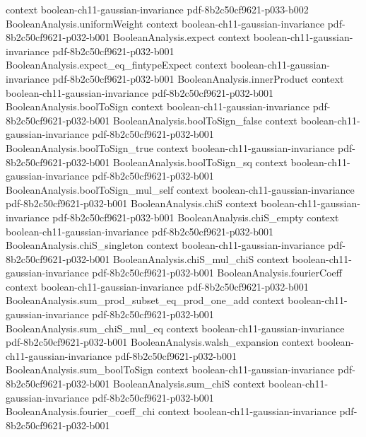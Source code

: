 \begin{theorem}
  {context}
  {boolean-ch11-gaussian-invariance}
  {pdf-8b2c50cf9621-p033-b002}
\proofstep
  {BooleanAnalysis.uniformWeight}
  {context}
  {boolean-ch11-gaussian-invariance}
  {pdf-8b2c50cf9621-p032-b001}
\proofstep
  {BooleanAnalysis.expect}
  {context}
  {boolean-ch11-gaussian-invariance}
  {pdf-8b2c50cf9621-p032-b001}
\proofstep
  {BooleanAnalysis.expect_eq_fintypeExpect}
  {context}
  {boolean-ch11-gaussian-invariance}
  {pdf-8b2c50cf9621-p032-b001}
\proofstep
  {BooleanAnalysis.innerProduct}
  {context}
  {boolean-ch11-gaussian-invariance}
  {pdf-8b2c50cf9621-p032-b001}
\proofstep
  {BooleanAnalysis.boolToSign}
  {context}
  {boolean-ch11-gaussian-invariance}
  {pdf-8b2c50cf9621-p032-b001}
\proofstep
  {BooleanAnalysis.boolToSign_false}
  {context}
  {boolean-ch11-gaussian-invariance}
  {pdf-8b2c50cf9621-p032-b001}
\proofstep
  {BooleanAnalysis.boolToSign_true}
  {context}
  {boolean-ch11-gaussian-invariance}
  {pdf-8b2c50cf9621-p032-b001}
\proofstep
  {BooleanAnalysis.boolToSign_sq}
  {context}
  {boolean-ch11-gaussian-invariance}
  {pdf-8b2c50cf9621-p032-b001}
\proofstep
  {BooleanAnalysis.boolToSign_mul_self}
  {context}
  {boolean-ch11-gaussian-invariance}
  {pdf-8b2c50cf9621-p032-b001}
\proofstep
  {BooleanAnalysis.chiS}
  {context}
  {boolean-ch11-gaussian-invariance}
  {pdf-8b2c50cf9621-p032-b001}
\proofstep
  {BooleanAnalysis.chiS_empty}
  {context}
  {boolean-ch11-gaussian-invariance}
  {pdf-8b2c50cf9621-p032-b001}
\proofstep
  {BooleanAnalysis.chiS_singleton}
  {context}
  {boolean-ch11-gaussian-invariance}
  {pdf-8b2c50cf9621-p032-b001}
\proofstep
  {BooleanAnalysis.chiS_mul_chiS}
  {context}
  {boolean-ch11-gaussian-invariance}
  {pdf-8b2c50cf9621-p032-b001}
\proofstep
  {BooleanAnalysis.fourierCoeff}
  {context}
  {boolean-ch11-gaussian-invariance}
  {pdf-8b2c50cf9621-p032-b001}
\proofstep
  {BooleanAnalysis.sum_prod_subset_eq_prod_one_add}
  {context}
  {boolean-ch11-gaussian-invariance}
  {pdf-8b2c50cf9621-p032-b001}
\proofstep
  {BooleanAnalysis.sum_chiS_mul_eq}
  {context}
  {boolean-ch11-gaussian-invariance}
  {pdf-8b2c50cf9621-p032-b001}
\proofstep
  {BooleanAnalysis.walsh_expansion}
  {context}
  {boolean-ch11-gaussian-invariance}
  {pdf-8b2c50cf9621-p032-b001}
\proofstep
  {BooleanAnalysis.sum_boolToSign}
  {context}
  {boolean-ch11-gaussian-invariance}
  {pdf-8b2c50cf9621-p032-b001}
\proofstep
  {BooleanAnalysis.sum_chiS}
  {context}
  {boolean-ch11-gaussian-invariance}
  {pdf-8b2c50cf9621-p032-b001}
\proofstep
  {BooleanAnalysis.fourier_coeff_chi}
  {context}
  {boolean-ch11-gaussian-invariance}
  {pdf-8b2c50cf9621-p032-b001}

\end{theorem}
